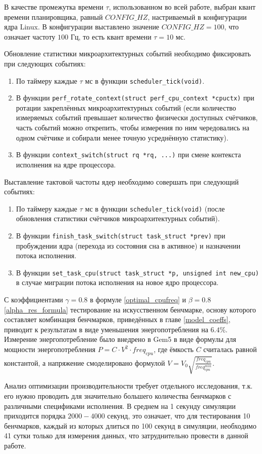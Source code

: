     В качестве промежутка времени $\tau$, использованном во всей работе, выбран квант времени планировщика,
    равный $CONFIG\_HZ$, настриваемый в конфигурации ядра Linux. В конфигурации выставлено значение
    $CONFIG\_HZ = 100$, что означает частоту $100$ Гц, то есть квант времени $\tau = 10$ мс.

    Обновление статистики микроархитектурных событий необходимо фиксировать при следующих событиях:
    \begin{enumerate}
        \item По таймеру каждые $\tau$ мс в функции \lstinline{scheduler_tick(void)}.
        \item В функции \lstinline{perf_rotate_context(struct perf_cpu_context *cpuctx)} при ротации
        закреплённых микроархитектурных событий (если количество измеряемых событий
        превышает количество физически доступных счётчиков, часть событий можно открепить, чтобы измерения по ним
        чередовались на одном счётчике и собирали менее точную усреднённую статистику).
        \item В функции \lstinline{context_switch(struct rq *rq, ...)} при смене контекста исполнения на
        ядре процессора.
    \end{enumerate}

    Выставление тактовой частоты ядер необходимо совершать при следующий событиях:
    \begin{enumerate}
        \item По таймеру каждые $\tau$ мс в функции \lstinline{scheduler_tick(void)} (после обновления статистики
        счётчиков микроархитектурных событий).
        \item В функции \lstinline{finish_task_switch(struct task_struct *prev)} при пробуждении ядра
        (перехода из состояния сна в активное) и назначении потока исполнения.
        \item В функции \lstinline{set_task_cpu(struct task_struct *p, unsigned int new_cpu)} в случае миграции
        потока исполнения на новое ядро процессора.
    \end{enumerate}

    С коэффициентами $\gamma = 0.8$ в формуле \eqref{optimal_cpufreq} и $\beta = 0.8$ \eqref{alpha_res_formula}
    тестирование на искусственном бенчмарке, основу которого составляет комбинация бенчмарков, приведённых в
    главе \ref{model_coeffs}, приводит к результатам в виде уменьшения энергопотребления на $6.4\%$. Измерение
    энергопотребление было внедрено в Gem5 в виде формулы для мощности энергопотребления $P = C \cdot V^2 \cdot freq_{cpu}$,
    где ёмкость $C$ считалась равной константой, а напряжение смоделировано формулой
    $V = V_0 \sqrt{\frac{freq_{cpu}}{freq_{cpu}^{min}}}$.

    Анализ оптимизации производительности требует отдельного исследования, т.к. его нужно проводить для значительно
    большего количества бенчмарков с различными спецификами исполнения. В среднем на 1 секунду симуляции приходится
    порядка $2000-4000$ секунд, это означает, что для тестирования 10 бенчмарков, каждый из которых длиться
    по 100 секунд в симуляции, необходимо 41 сутки только для измерения данных, что затруднительно провести в данной работе.

\newpage
